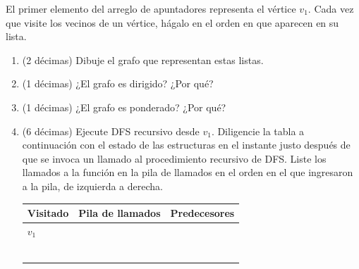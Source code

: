 {\begin{center}
\end{center}

El primer elemento del arreglo de apuntadores representa el vértice \(v_1\). Cada vez que visite los vecinos de un vértice, hágalo en el orden en que aparecen en su lista.
}

\begin{enumerate}
  \item (2 décimas) Dibuje el grafo que representan estas listas.
  \item (1 décimas) ¿El grafo es dirigido? ¿Por qué?
  \item (1 décimas) ¿El grafo es ponderado? ¿Por qué?
  \item (6 décimas) Ejecute DFS recursivo desde \(v_1\). Diligencie la tabla a continuación con el estado de las estructuras en el instante justo después de que se invoca un llamado al procedimiento recursivo de DFS. Liste los llamados a la función en la pila de llamados en el orden en el que ingresaron a la pila, de izquierda a derecha.

\begin{center}
\begin{tabularx}{\textwidth}{|>{\centering\arraybackslash}X|>{\centering\arraybackslash}X|>{\centering\arraybackslash}X|}
\hline
\textbf{Visitado} & \textbf{Pila de llamados} & \textbf{Predecesores} \\
\hline
$v_1$ \rule{0pt}{0.9cm} & & \\
\hline
\rule{0pt}{0.9cm} & & \\
\hline
\rule{0pt}{0.9cm} & & \\
\hline
\rule{0pt}{0.9cm} & & \\
\hline
\rule{0pt}{0.9cm} & & \\
\hline
\rule{0pt}{0.9cm} & & \\
\hline
\rule{0pt}{0.9cm} & & \\
\hline
\end{tabularx}
\end{center}
\end{enumerate}

\bigskip

